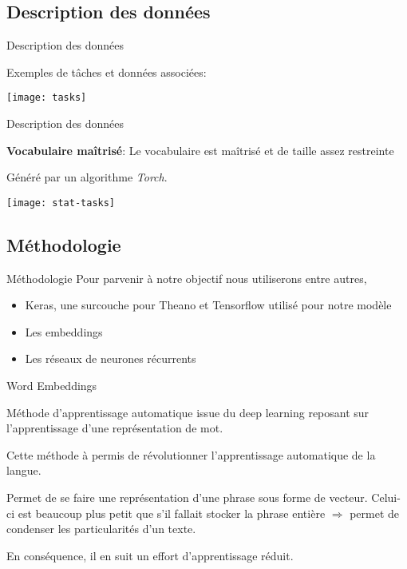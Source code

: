 \documentclass{beamer}
\theoremstyle{definition}
\begin{document}
\subsection{Description des données}

\begin{frame}{Description des données}

Exemples de tâches et données associées:

\center\texttt{[image: tasks]}
    
\end{frame}

\begin{frame}{Description des données}

\textbf{Vocabulaire maîtrisé}: Le vocabulaire est maîtrisé et de taille assez restreinte
\pause  

\vspace{0.5cm}

Généré par un algorithme \textit{Torch}.\pause

\center\texttt{[image: stat-tasks]}
    
\end{frame}

\subsection{Méthodologie}

\begin{frame}{Méthodologie}
Pour parvenir à notre objectif nous utiliserons entre autres,

\begin{itemize}
\item Keras, une surcouche pour Theano et Tensorflow utilisé pour notre modèle
\item Les embeddings
\item Les réseaux de neurones récurrents
\end{itemize}

\end{frame}

\begin{frame}{Word Embeddings}

Méthode d'apprentissage automatique issue du deep learning reposant sur l'apprentissage d'une représentation de mot.

\vspace{0.2cm}

Cette méthode à permis de révolutionner l'apprentissage automatique de la langue.

\vspace{0.5cm}

Permet de se faire une représentation d'une phrase sous forme de vecteur. Celui-ci est beaucoup plus petit que s'il fallait stocker la phrase entière $\Rightarrow$ permet de condenser les particularités d'un texte.

\vspace{0.5cm}

En conséquence, il en suit un effort d'apprentissage réduit.


\end{frame}
\end{document}
